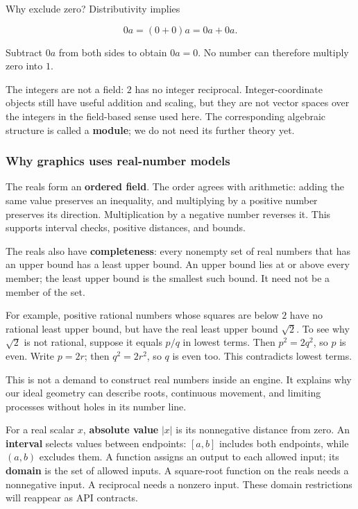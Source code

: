 Why exclude zero? Distributivity implies

\[
0a=(0+0)a=0a+0a.
\]

Subtract \(0a\) from both sides to obtain \(0a=0\). No number can therefore multiply zero into \(1\).

The integers are not a field: \(2\) has no integer reciprocal. Integer-coordinate objects still have useful addition and scaling, but they are not vector spaces over the integers in the field-based sense used here. The corresponding algebraic structure is called a \textbf{module}; we do not need its further theory yet.

\subsubsection{Why graphics uses real-number models}\label{01-foundations-i-ch017-why-graphics-uses-real-number-models}

The reals form an \textbf{ordered field}. The order agrees with arithmetic: adding the same value preserves an inequality, and multiplying by a positive number preserves its direction. Multiplication by a negative number reverses it. This supports interval checks, positive distances, and bounds.

The reals also have \textbf{completeness}: every nonempty set of real numbers that has an upper bound has a least upper bound. An upper bound lies at or above every member; the least upper bound is the smallest such bound. It need not be a member of the set.

For example, positive rational numbers whose squares are below \(2\) have no rational least upper bound, but have the real least upper bound \(\sqrt2\). To see why \(\sqrt2\) is not rational, suppose it equals \(p/q\) in lowest terms. Then \(p^2=2q^2\), so \(p\) is even. Write \(p=2r\); then \(q^2=2r^2\), so \(q\) is even too. This contradicts lowest terms.

This is not a demand to construct real numbers inside an engine. It explains why our ideal geometry can describe roots, continuous movement, and limiting processes without holes in its number line.

For a real scalar \(x\), \textbf{absolute value} \(|x|\) is its nonnegative distance from zero. An \textbf{interval} selects values between endpoints: \([a,b]\) includes both endpoints, while \((a,b)\) excludes them. A function assigns an output to each allowed input; its \textbf{domain} is the set of allowed inputs. A square-root function on the reals needs a nonnegative input. A reciprocal needs a nonzero input. These domain restrictions will reappear as API contracts.


